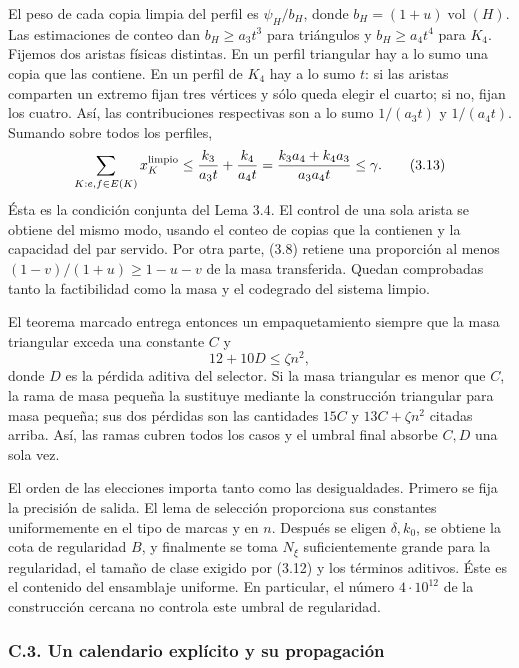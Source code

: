 \documentclass[spanish,11pt,a4paper]{article}
\begin{document}
El peso de cada copia limpia del perfil es \(\psi_H/b_H\), donde \(b_H=(1+u)\operatorname{vol}(H)\). Las estimaciones de conteo dan \(b_H\ge a_3t^3\) para triángulos y \(b_H\ge a_4t^4\) para \(K_4\). Fijemos dos aristas físicas distintas. En un perfil triangular hay a lo sumo una copia que las contiene. En un perfil de \(K_4\) hay a lo sumo \(t\): si las aristas comparten un extremo fijan tres vértices y sólo queda elegir el cuarto; si no, fijan los cuatro. Así, las contribuciones respectivas son a lo sumo \(1/(a_3t)\) y \(1/(a_4t)\). Sumando sobre todos los perfiles, \[
\sum_{K:e,f\in E(K)}x_K^{\rm limpio}
\le\frac{k_3}{a_3t}+\frac{k_4}{a_4t}
=\frac{k_3a_4+k_4a_3}{a_3a_4t}\le\gamma.
\tag{3.13}
\] Ésta es la condición conjunta del Lema 3.4. El control de una sola arista se obtiene del mismo modo, usando el conteo de copias que la contienen y la capacidad del par servido. Por otra parte, (3.8) retiene una proporción al menos \((1-v)/(1+u)\ge1-u-v\) de la masa transferida. Quedan comprobadas tanto la factibilidad como la masa y el codegrado del sistema limpio.

El teorema marcado entrega entonces un empaquetamiento siempre que la masa triangular exceda una constante \(C\) y \[
12+10D\le\zeta n^2,
\tag{3.14}
\] donde \(D\) es la pérdida aditiva del selector. Si la masa triangular es menor que \(C\), la rama de masa pequeña la sustituye mediante la construcción triangular para masa pequeña; sus dos pérdidas son las cantidades \(15C\) y \(13C+\zeta n^2\) citadas arriba. Así, las ramas cubren todos los casos y el umbral final absorbe \(C,D\) una sola vez.

El orden de las elecciones importa tanto como las desigualdades. Primero se fija la precisión de salida. El lema de selección proporciona sus constantes uniformemente en el tipo de marcas y en \(n\). Después se eligen \(\delta,k_0\), se obtiene la cota de regularidad \(B\), y finalmente se toma \(N_\xi\) suficientemente grande para la regularidad, el tamaño de clase exigido por (3.12) y los términos aditivos. Éste es el contenido del ensamblaje uniforme. En particular, el número \(4\cdot10^{12}\) de la construcción cercana no controla este umbral de regularidad.

\subsubsection{C.3. Un calendario explícito y su propagación}\label{c.3.-un-calendario-explicito-y-su-propagacion}
\end{document}
